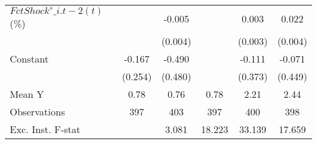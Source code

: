 {\begin{tabular}{l*{5}{c}}
\addlinespace
$ FctShock^s\_{i.t-2}(t)$ (\%)&                     &      -0.005         &                     &       0.003         &       0.022\sym{***}\\
                    &                     &     (0.004)         &                     &     (0.003)         &     (0.004)         \\
\addlinespace
Constant            &      -0.167         &      -0.490         &                     &      -0.111         &      -0.071         \\
                    &     (0.254)         &     (0.480)         &                     &     (0.373)         &     (0.449)         \\
\midrule
Mean Y              &        0.78         &        0.76         &        0.78         &        2.21         &        2.44         \\
Observations        &         397         &         403         &         397         &         400         &         398         \\
Exc. Inst. F-stat   &                     &       3.081         &      18.223         &      33.139         &      17.659         \\
\bottomrule
\end{tabular}
}
